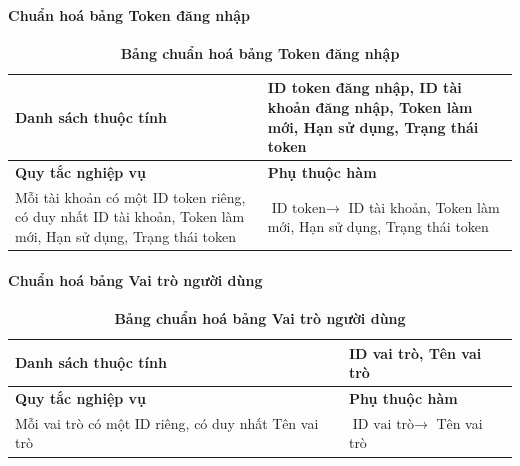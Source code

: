 \paragraph{Chuẩn hoá bảng Token đăng nhập}
\mbox{}
\begin{table}[H]
	\caption{\bfseries \fontsize{12pt}{0pt}\selectfont Bảng chuẩn hoá bảng Token đăng nhập}
	\centering
	\begin{tabularx}{0.9\textwidth}{|X|X|}
		\hline
		\textbf{Danh sách thuộc tính} & ID token đăng nhập, ID tài khoản đăng nhập, Token làm mới, Hạn sử dụng, Trạng thái token                         \\
		\hline
		\textbf{Quy tắc nghiệp vụ}    & \textbf{Phụ thuộc hàm}                                                                                           \\
		\hline
		Mỗi tài khoản có một ID token riêng, có duy nhất ID tài khoản, Token làm mới, Hạn sử dụng, Trạng thái token
		                              & \parbox[t]{\linewidth}{$\text{ID token} \rightarrow$ ID tài khoản, Token làm mới, Hạn sử dụng, Trạng thái token} \\
		\hline
		                                                               \\
		                                                                         \\
		\hline
	\end{tabularx}
\end{table}

\cleardoublepage

\paragraph{Chuẩn hoá bảng Vai trò người dùng}
\mbox{}
\begin{table}[H]
	\caption{\bfseries \fontsize{12pt}{0pt}\selectfont Bảng chuẩn hoá bảng Vai trò người dùng}
	\centering
	\begin{tabularx}{0.9\textwidth}{|X|X|}
		\hline
		\textbf{Danh sách thuộc tính} & ID vai trò, Tên vai trò                                             \\
		\hline
		\textbf{Quy tắc nghiệp vụ}    & \textbf{Phụ thuộc hàm}                                              \\
		\hline
		Mỗi vai trò có một ID riêng, có duy nhất Tên vai trò
		                              & \parbox[t]{\linewidth}{$\text{ID vai trò} \rightarrow$ Tên vai trò} \\
		\hline
		                          \\
		                         \\
		\hline
	\end{tabularx}
\end{table}

